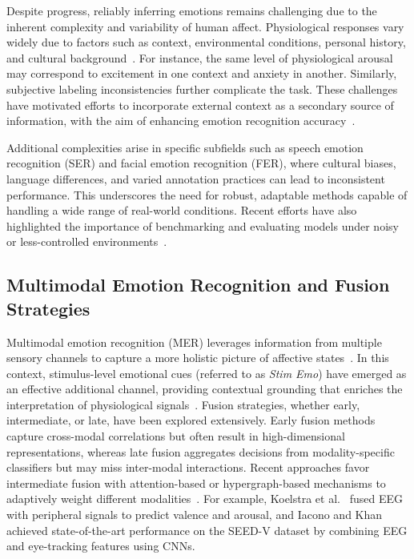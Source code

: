 \documentclass[sigconf]{acmart}
\begin{document}
Despite progress, reliably inferring emotions remains challenging due to the inherent complexity and variability of human affect. Physiological responses vary widely due to factors such as context, environmental conditions, personal history, and cultural background~\cite{Larradet2020,Li2018}. For instance, the same level of physiological arousal may correspond to excitement in one context and anxiety in another. Similarly, subjective labeling inconsistencies further complicate the task. These challenges have motivated efforts to incorporate external context as a secondary source of information, with the aim of enhancing emotion recognition accuracy~\cite{Malhotra2023,Liu2023,Pinitas2024}.

Additional complexities arise in specific subfields such as speech emotion recognition (SER) and facial emotion recognition (FER), where cultural biases, language differences, and varied annotation practices can lead to inconsistent performance. This underscores the need for robust, adaptable methods capable of handling a wide range of real-world conditions. Recent efforts have also highlighted the importance of benchmarking and evaluating models under noisy or less-controlled environments~\cite{Petrogianni2024,Alisamir2022,Civit2023}.

\subsection*{Multimodal Emotion Recognition and Fusion Strategies}

Multimodal emotion recognition (MER) leverages information from multiple sensory channels to capture a more holistic picture of affective states~\cite{Paulmann2011,MultimodalEmotionPerception}. In this context, stimulus-level emotional cues (referred to as \emph{Stim Emo}) have emerged as an effective additional channel, providing contextual grounding that enriches the interpretation of physiological signals~\cite{NeuralProcessingEmotion,Paulmann2011,Malhotra2023}. Fusion strategies, whether early, intermediate, or late, have been explored extensively. Early fusion methods capture cross-modal correlations but often result in high-dimensional representations, whereas late fusion aggregates decisions from modality-specific classifiers but may miss inter-modal interactions. Recent approaches favor intermediate fusion with attention-based or hypergraph-based mechanisms to adaptively weight different modalities~\cite{Lisetti2004,DMello2015,Zhao2018,Ashwath2023,Taherzadeh2022}. For example, Koelstra et al.~\cite{Koelstra2012} fused EEG with peripheral signals to predict valence and arousal, and Iacono and Khan~\cite{Iacono2024} achieved state-of-the-art performance on the SEED-V dataset by combining EEG and eye-tracking features using CNNs.
\end{document}
